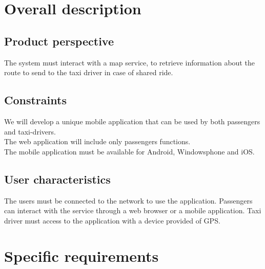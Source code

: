 \documentclass[a4paper,11pt]{report}
\begin{document}
\chapter*{Overall description}
\addtocounter{chapter}{1}
\section{Product perspective}
The system must interact with a map service, to retrieve information about the route to send to the taxi driver in case of shared ride.
\section{Constraints}
We will develop a unique mobile application that can be used by both passengers and taxi-drivers.\\
The web application will include only passengers functions.\\
The mobile application must be available for Android, Windowsphone and iOS.\\
\section{User characteristics}
The users must be connected to the network to use the application.
Passengers can interact with the service through a web browser or a mobile application.
Taxi driver must access to the application with a device provided of GPS.
\chapter*{Specific requirements}
\addtocounter{chapter}{1}
\end{document}
